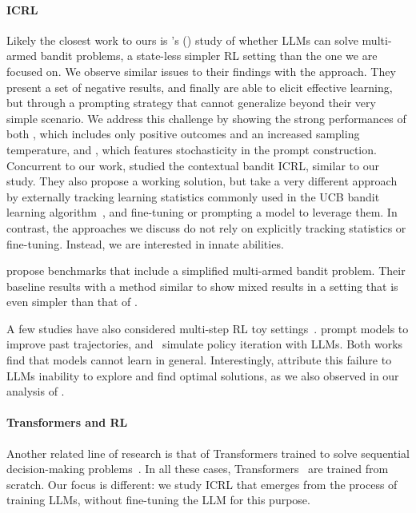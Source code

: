 \paragraph{ICRL}
Likely the closest work to ours is \citeauthor{krishnamurthy2024largelanguagemodelsexplore}'s (\citeyear{krishnamurthy2024largelanguagemodelsexplore}) study of whether LLMs can solve multi-armed bandit problems, a state-less simpler RL setting than the one we are focused on.
We observe similar issues to their findings with the \naiveshort approach. 
They present a set of negative results, and finally are able to elicit effective learning, but through a prompting strategy that cannot generalize beyond their very simple scenario. 
We address this challenge by showing the strong performances of both \naiveplusshort, which includes only positive outcomes and an increased sampling temperature, and \expshort, which features stochasticity in the prompt construction. 
Concurrent to our work, \citet{nie2024evolve} studied the contextual bandit ICRL, similar to our study. They also propose a working solution, but take a very different approach by externally tracking learning statistics commonly used in the UCB bandit learning algorithm~\citep{Auer2002}, and fine-tuning or prompting a model to leverage them. 
In contrast, the approaches we discuss do not rely on explicitly tracking statistics or fine-tuning. Instead, we are interested in innate abilities. 

\citet{wu2024smartplaybenchmarkllmsintelligent} propose benchmarks that include a simplified multi-armed bandit problem. Their baseline results with a method similar to \naiveshort show mixed results in a setting that is even simpler than that of \citet{krishnamurthy2024largelanguagemodelsexplore}.


A few studies have also considered multi-step RL toy settings~\citep{NEURIPS2023_60dc7fa8, mirchandani2023large}. \citet{mirchandani2023large} prompt models to improve past trajectories, and~\citet{NEURIPS2023_60dc7fa8} simulate policy iteration with LLMs.
Both works find that models cannot learn in general. Interestingly, \citet{mirchandani2023large} attribute this failure to LLMs inability to explore and find optimal solutions, as we also observed in our analysis of \naiveshort.

\paragraph{Transformers and RL}
Another related line of research is that of Transformers trained to solve sequential decision-making problems~\citep{janner2021sequence, chen2021decision, pmlr-v162-xu22g,laskin2022incontextreinforcementlearningalgorithm, pmlr-v162-zheng22c, NEURIPS2023_8644b61a, grigsby2023amago, raparthy2023generalizationnewsequentialdecision}. In all these cases, Transformers~\citep{vaswani2017attention} are trained from scratch. Our focus is different: we study ICRL that emerges from the process of training LLMs, without fine-tuning the LLM for this purpose. 

